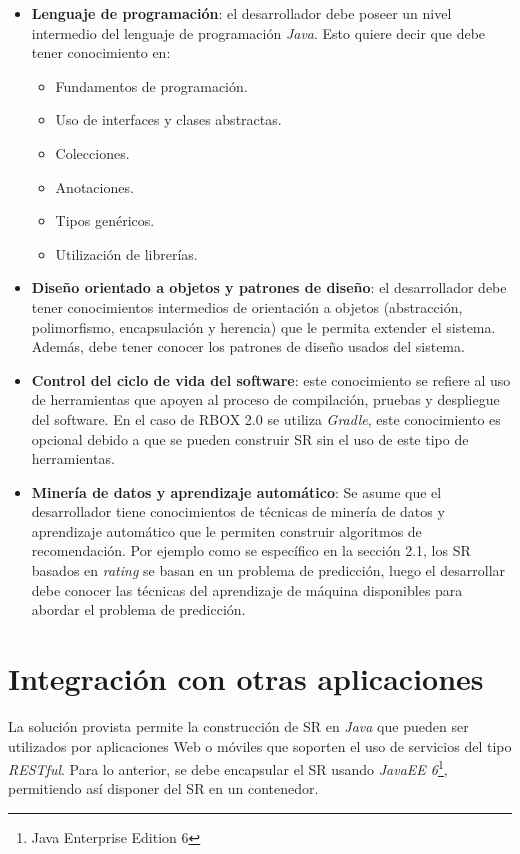 \begin{itemize}
\item{\textbf{Lenguaje de programación}}: el desarrollador debe poseer un nivel intermedio del lenguaje de programación \textit{Java}. Esto quiere decir que debe tener conocimiento en:
\begin{itemize}
\item Fundamentos de programación.
\item Uso de interfaces y clases abstractas.
\item Colecciones.
\item Anotaciones.
\item Tipos genéricos.
\item Utilización de librerías.
\end{itemize}

\item{\textbf{Diseño orientado a objetos y patrones de diseño}}: el desarrollador debe tener conocimientos intermedios de orientación a objetos (abstracción, polimorfismo, encapsulación y herencia) que le permita extender el sistema. Además, debe tener conocer los patrones de diseño usados del sistema.

\item{\textbf{Control del ciclo de vida del software}}: este conocimiento se refiere al uso de herramientas que apoyen al proceso de compilación, pruebas y despliegue del software. En el caso de RBOX 2.0 se utiliza \textit{Gradle}, este conocimiento es opcional debido a que se pueden construir SR sin el uso de este tipo de herramientas. 

\item{\textbf{Minería de datos y aprendizaje automático}}: Se asume que el desarrollador tiene conocimientos de técnicas de minería de datos y aprendizaje automático que le permiten construir algoritmos de recomendación. Por ejemplo como se específico en la sección 2.1, los SR basados en \textit{rating} se basan en un problema de predicción, luego el desarrollar debe conocer las técnicas del aprendizaje de máquina disponibles para abordar el problema de predicción.

\end{itemize}

\section{Integración con otras aplicaciones}

La solución provista permite la construcción de SR en \textit{Java} que pueden ser utilizados por aplicaciones Web o móviles que soporten el uso de servicios del tipo \textit{RESTful}. Para lo anterior, se debe encapsular el SR usando \textit{JavaEE 6}\footnote{Java Enterprise Edition 6}, permitiendo así disponer del SR en un contenedor.

